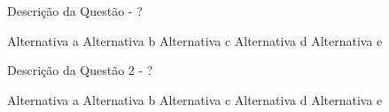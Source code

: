 \documentclass[a4paper, 11pt, addpoints]{exam}
\begin{document}
\begin{questions}
\begin{multicols}{2}




\question[2] Descrição da Questão - ?

\begin{choices}
\CorrectChoice Alternativa a
\choice Alternativa b
\choice Alternativa c
\choice Alternativa d
\choice Alternativa e
\end{choices}

\question[2] Descrição da Questão 2 - ?

\begin{choices}
\CorrectChoice Alternativa a
\choice Alternativa b
\choice Alternativa c
\choice Alternativa d
\choice Alternativa e
\end{choices}












\end{multicols}
\end{questions}
\end{document}
